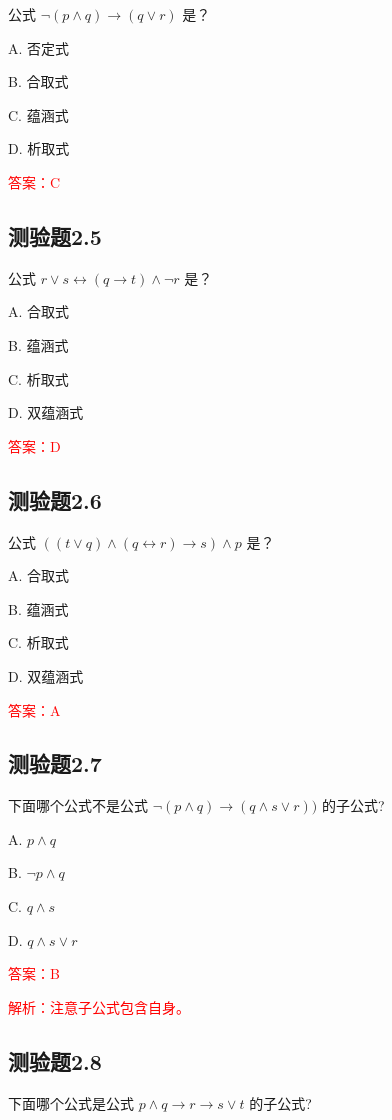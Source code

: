 \documentclass[UTF8, heading=true]{ctexart}
\begin{document}
公式 $\neg(p \wedge q) \rightarrow(q \vee r)$ 是？

A. 否定式

B. 合取式

C. 蕴涵式

D. 析取式

\textcolor{red}{答案：C}

\subsection{测验题2.5}

公式 $r \vee s \leftrightarrow(q \rightarrow t) \wedge \neg r$ 是？

A. 合取式

B. 蕴涵式

C. 析取式

D. 双蕴涵式

\textcolor{red}{答案：D}

\subsection{测验题2.6}

公式 $((t \vee q) \wedge(q \leftrightarrow r) \rightarrow s) \wedge p$ 是？

A. 合取式

B. 蕴涵式

C. 析取式

D. 双蕴涵式

\textcolor{red}{答案：A}

\subsection{测验题2.7}

下面哪个公式不是公式 $\neg(p \wedge q) \rightarrow(q \wedge s \vee r))$ 的子公式? $\qquad$

A. $
p \wedge q
$

B. $
\neg p \wedge q
$

C. $
q \wedge s
$

D. $
q \wedge s \vee r
$

\textcolor{red}{答案：B}

\textcolor{red}{解析：注意子公式包含自身。}

\subsection{测验题2.8}

下面哪个公式是公式 $p \wedge q \rightarrow r \rightarrow s \vee t$ 的子公式?
\end{document}
